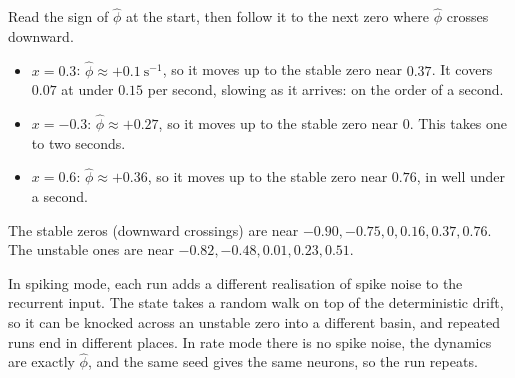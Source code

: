 \documentclass[11pt,letterpaper]{article}
\newcommand{\ans}[1]{\par\vspace{4pt}{\bfseries #1}\quad}
\begin{document}
\ans{Q1}
Read the sign of $\hat\phi$ at the start, then follow it to the next zero where $\hat\phi$ crosses downward.
\begin{itemize}[leftmargin=1.2em]
\item $x = 0.3$: $\hat\phi \approx +0.1\ \mathrm{s^{-1}}$, so it moves up to the stable zero near $0.37$. It covers $0.07$ at under $0.15$ per second, slowing as it arrives: on the order of a second.
\item $x = -0.3$: $\hat\phi \approx +0.27$, so it moves up to the stable zero near $0$. This takes one to two seconds.
\item $x = 0.6$: $\hat\phi \approx +0.36$, so it moves up to the stable zero near $0.76$, in well under a second.
\end{itemize}
The stable zeros (downward crossings) are near $-0.90, -0.75, 0, 0.16, 0.37, 0.76$. The unstable ones are near $-0.82, -0.48, 0.01, 0.23, 0.51$.
\begin{center}
\end{center}

\ans{Q2}
In spiking mode, each run adds a different realisation of spike noise to the recurrent input. The state takes a random walk on top of the deterministic drift, so it can be knocked across an unstable zero into a different basin, and repeated runs end in different places. In rate mode there is no spike noise, the dynamics are exactly $\hat\phi$, and the same seed gives the same neurons, so the run repeats.
\end{document}
